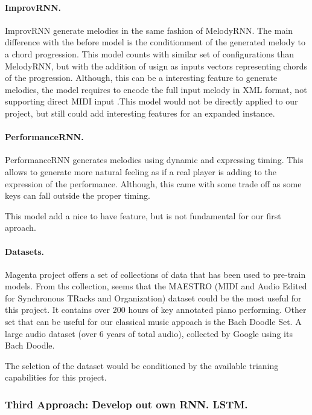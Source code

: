 \paragraph{ImprovRNN.}
ImprovRNN generate melodies in the same fashion of MelodyRNN. The main difference with the
before model is the conditionment of the generated melody to a chord progression. This
model counts with similar set of configurations than MelodyRNN, but with the addition of
usign as inputs vectors representing chords of the progression. Although, this can be a
interesting feature to generate melodies, the model requires to encode the full input
melody in XML format, not supporting direct MIDI input \autocite{improvRNN}.This model
would not be directly applied to our project, but still could add interesting features for
an expanded instance.

\paragraph{PerformanceRNN.}
PerformanceRNN generates melodies using dynamic and expressing timing. This allows to
generate more natural feeling as if a real player is adding to the expression of the
performance. Although, this came with some trade off as some keys can fall outside the
proper timing. \autocite{performanceRNN}

This model add a nice to have feature, but is not fundamental for our first aproach.

\paragraph{Datasets.}
Magenta project offers a set of collections of data that has been used to pre-train
models. From ths collection, seems that the MAESTRO (MIDI and Audio Edited for Synchronous
TRacks and Organization) dataset could be the most useful for this project. It contains
over 200 hours of key annotated piano performing. Other set that can be useful for our
classical music appoach is the Bach Doodle Set. A large audio dataset (over 6 years of
total audio), collected by Google using its Bach Doodle. \autocite{magentaData}

The selction of the dataset would be conditioned by the available trianing capabilities
for this project.

\subsubsection{Third Approach: Develop out own RNN. LSTM.}

